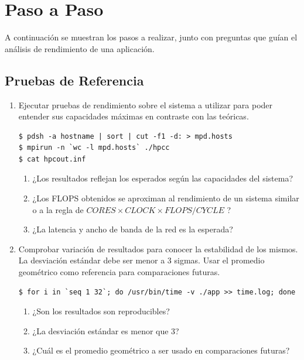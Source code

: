 \documentclass[a4paper]{report}
\begin{document}
\section{Paso a Paso}

A continuación se muestran los pasos a realizar, junto con preguntas que guían el análisis de rendimiento de una aplicación.

\subsection{Pruebas de Referencia}

\begin{enumerate}
\item Ejecutar pruebas de rendimiento sobre el sistema a utilizar para poder entender sus capacidades máximas en contraste con las teóricas.

\begin{lstlisting}
$ pdsh -a hostname | sort | cut -f1 -d: > mpd.hosts
$ mpirun -n `wc -l mpd.hosts` ./hpcc
$ cat hpcout.inf
\end{lstlisting}

\begin{enumerate}
\item ¿Los resultados reflejan los esperados según las capacidades del sistema?
\item ¿Los FLOPS obtenidos se aproximan al rendimiento de un sistema similar o a la regla de $ CORES \times CLOCK \times FLOPS/CYCLE $ ?
\item ¿La latencia y ancho de banda de la red es la esperada?
\end{enumerate}

\item Comprobar variación de resultados para conocer la estabilidad de los mismos. La desviación estándar debe ser menor a 3 sigmas. Usar el promedio geométrico como referencia para comparaciones futuras.

\begin{lstlisting}
$ for i in `seq 1 32`; do /usr/bin/time -v ./app >> time.log; done
\end{lstlisting}

\begin{enumerate}
\item ¿Son los resultados son reproducibles?
\item ¿La desviación estándar es menor que 3?
\item ¿Cuál es el promedio geométrico a ser usado en comparaciones futuras?
\end{enumerate}


\end{enumerate}
\end{document}
